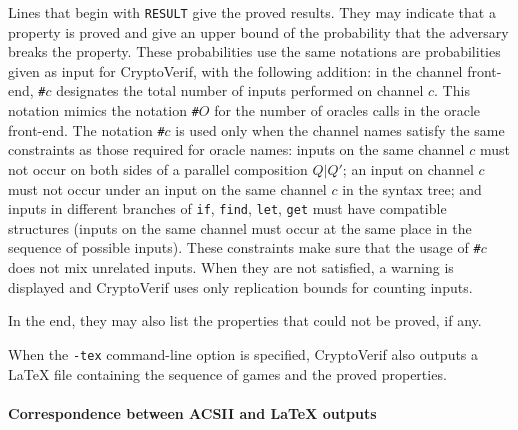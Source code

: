 \documentclass{article}
\begin{document}
Lines that begin with \texttt{RESULT} give the proved results.
They may indicate that a property is proved and give 
an upper bound of the probability that the adversary breaks
the property. These probabilities use the same notations
are probabilities given as input for CryptoVerif,
with the following addition: in the channel front-end,
\texttt{\#$c$} designates the total number of inputs performed on
channel $c$. 
This notation mimics the notation \texttt{\#$O$} for the
number of oracles calls in the oracle front-end.
The notation \texttt{\#$c$} is used only when the channel names
satisfy the same constraints as those required for oracle names:
inputs on the same channel $c$ must not occur on both sides
of a parallel composition $Q \texttt{|} Q'$;
an input on channel $c$ must not occur under an input on the same channel $c$
in the syntax tree; and inputs in different branches
of \texttt{if}, \texttt{find}, \texttt{let}, \texttt{get} must have
compatible structures (inputs on the same channel must occur at the
same place in the sequence of possible inputs). These constraints
make sure that the usage of \texttt{\#$c$} does not mix unrelated
inputs. When they are not satisfied, a warning is displayed and
CryptoVerif uses only replication bounds for counting inputs.

In the end, they may also list the properties that could not be
proved, if any.

When the \texttt{-tex} command-line option is specified,
CryptoVerif also outputs a {\LaTeX} file containing the 
sequence of games and the proved properties.

\paragraph{Correspondence between ACSII and {\LaTeX} outputs}
\end{document}
